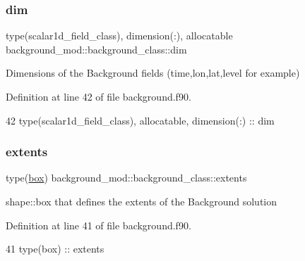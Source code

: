 \subsubsection{\texorpdfstring{dim}{dim}}
{\footnotesize\ttfamily type(scalar1d\+\_\+field\+\_\+class), dimension(\+:), allocatable background\+\_\+mod\+::background\+\_\+class\+::dim\hspace{0.3cm}{\ttfamily [private]}}



Dimensions of the Background fields (time,lon,lat,level for example) 



Definition at line 42 of file background.\+f90.


\begin{DoxyCode}
42         \textcolor{keywordtype}{type}(scalar1d\_field\_class), \textcolor{keywordtype}{allocatable}, \textcolor{keywordtype}{dimension(:)} :: dim
\end{DoxyCode}
\mbox{\label{structbackground__mod_1_1background__class_acaaef54168dbee2731a99d0852844844}} 
\subsubsection{\texorpdfstring{extents}{extents}}
{\footnotesize\ttfamily type(\mbox{\hyperlink{structgeometry__mod_1_1box}{box}}) background\+\_\+mod\+::background\+\_\+class\+::extents\hspace{0.3cm}{\ttfamily [private]}}



shape\+::box that defines the extents of the Background solution 



Definition at line 41 of file background.\+f90.


\begin{DoxyCode}
41         \textcolor{keywordtype}{type}(box) :: extents
\end{DoxyCode}
\mbox{\label{structbackground__mod_1_1background__class_a68b750f0476dc75b886638a45a45f8f6}} 
